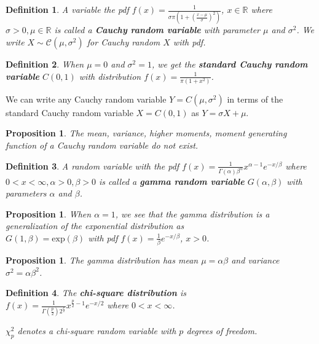 \documentclass[12pt,twoside]{report}
\theoremstyle{thmstyle}
\newtheorem{defn}{Definition}
\newtheorem{prop}[subsection]{Proposition}
\begin{document}
\begin{defn}
    A variable the pdf $f(x) = \displaystyle \frac{1}{\sigma \pi (1 + \left( \frac{x - \mu}{\sigma} \right)^2 )}$, $x \in \mathbb{R}$ where $\sigma > 0, \mu \in \mathbb{R}$ is called a \textbf{Cauchy random variable} with parameter $\mu$ and $\sigma^2$.
    We write $X \sim \mathcal{C}(\mu, \sigma^2)$ for Cauchy random $X$ with pdf.
\end{defn}

\begin{defn}
    When $\mu = 0$ and $\sigma^2 = 1$, we get the \textbf{standard Cauchy random variable} $C(0,1)$ with distribution $f(x) = \displaystyle \frac{1}{\pi (1 + x^2)}$.
\end{defn}

We can write any Cauchy random variable $Y = C(\mu, \sigma^2)$ in terms of the standard Cauchy random variable $X = C(0,1)$ as $Y = \sigma X + \mu$.

\begin{prop}
The mean, variance, higher moments, moment generating function of a Cauchy random variable do not exist.
\end{prop}

\begin{defn}
    A random variable with the pdf $f(x) = \displaystyle  \frac{1}{\Gamma(\alpha) \beta^\alpha} x^{\alpha - 1} e^{-x/\beta}$ where $0 < x < \infty, \alpha > 0, \beta > 0$ is called a \textbf{gamma random variable} $G(\alpha, \beta)$ with parameters $\alpha$ and $\beta$.
\end{defn}
\begin{prop}
    When $\alpha=1$, we see that the gamma distribution is a generalization of the exponential distribution as \\
$G(1, \beta) = \text{exp}(\beta)$ with pdf $f(x) = \frac{1}{\beta} e^{-x/\beta}$, $x > 0$.
\end{prop}

\begin{prop}
The gamma distribution has mean $\mu = \alpha \beta$ and variance $\sigma^2 = \alpha \beta^2$.
\end{prop}

\begin{defn}
    The \textbf{chi-square distribution} is \\
    $f(x) = \displaystyle \frac{1}{\Gamma(\frac{p}{2}) 2^{\frac{p}{2}}} x^{\frac{p}{2} - 1} e ^{-x/2}$ where $0 < x < \infty$.

    \vspace{0.5cm}
    $\chi_p^2$ denotes a chi-square random variable with $p$ degrees of freedom.
\end{defn}
\end{document}
